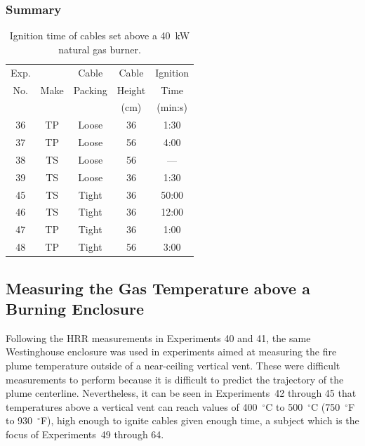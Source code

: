 \subsubsection{Summary}

\begin{table}[ht]
\begin{center}
\caption[Results of cable tray ignition experiments]{Ignition time of cables set above a 40~kW natural gas burner.}
\label{matrix2}
\begin{tabular}{|c|c|c|c|c|}
\hline
Exp.   &          & Cable             & Cable         & Ignition         \\
No.    & Make     & Packing           & Height        & Time             \\
       &          &                   & (cm)          & (min:s)          \\ \hline
36     & TP       & Loose             & 36            & 1:30             \\ \hline
37     & TP       & Loose             & 56            & 4:00             \\ \hline
38     & TS       & Loose             & 56            & ---              \\ \hline
39     & TS       & Loose             & 36            & 1:30             \\ \hline
45     & TS       & Tight             & 36            & 50:00            \\ \hline
46     & TS       & Tight             & 36            & 12:00            \\ \hline
47     & TP       & Tight             & 36            & 1:00             \\ \hline
48     & TP       & Tight             & 56            & 3:00             \\ \hline

\end{tabular}
\end{center}
\end{table}



\clearpage

\subsection{Measuring the Gas Temperature above a Burning Enclosure}

Following the HRR measurements in Experiments 40 and 41, the same Westinghouse enclosure was used in experiments aimed at measuring the fire plume temperature outside of a near-ceiling vertical vent. These were difficult measurements to perform because it is difficult to predict the trajectory of the plume centerline. Nevertheless, it can be seen in Experiments~42 through 45 that temperatures above a vertical vent can reach values of 400~$^\circ$C to 500~$^\circ$C (750~$^\circ$F to 930~$^\circ$F), high enough to ignite cables given enough time, a subject which is the focus of Experiments~49 through 64.



